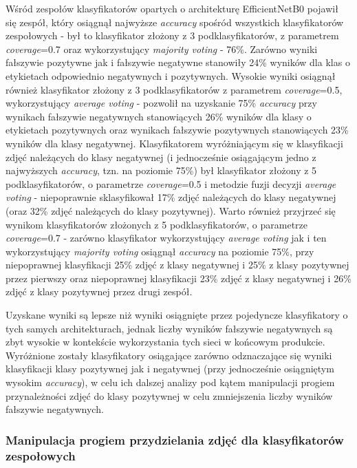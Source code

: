 \documentclass[polish,12pt]{aghthesis}
\begin{document}
Wśród zespołów klasyfikatorów opartych o architekturę EfficientNetB0 pojawił się zespół, który osiągnął najwyższe \textit{accuracy} spośród wszystkich klasyfikatorów zespołowych - był to klasyfikator złożony z 3 podklasyfikatorów, z parametrem \textit{coverage}=0.7 oraz wykorzystujący \textit{majority voting} - 76\%. Zarówno wyniki fałszywie pozytywne jak i fałszywie negatywne stanowiły 24\% wyników dla klas o etykietach odpowiednio negatywnych i pozytywnych. Wysokie wyniki osiągnął również klasyfikator złożony z 3 podklasyfikatorów z parametrem \textit{coverage}=0.5, wykorzystujący \textit{average voting} - pozwolił na uzyskanie 75\% \textit{accuracy} przy wynikach fałszywie negatywnych stanowiących 26\% wyników dla klasy o etykietach pozytywnych oraz wynikach fałszywie pozytywnych stanowiących 23\% wyników dla klasy negatywnej. Klasyfikatorem wyróżniającym się w klasyfikacji zdjęć należących do klasy negatywnej (i jednocześnie osiągającym jedno z najwyższych \textit{accuracy}, tzn. na poziomie 75\%) był klasyfikator złożony z 5 podklasyfikatorów, o parametrze \textit{coverage}=0.5 i metodzie fuzji decyzji \textit{average voting} - niepoprawnie sklasyfikował 17\% zdjęć należących do klasy negatywnej (oraz 32\% zdjęć należących do klasy pozytywnej). Warto również przyjrzeć się wynikom klasyfikatorów złożonych z 5 podklasyfikatorów, o parametrze \textit{coverage}=0.7 - zarówno klasyfikator wykorzystujący \textit{average voting} jak i ten wykorzystujący \textit{majority voting} osiągnął \textit{accuracy} na poziomie 75\%, przy niepoprawnej klasyfikacji 25\% zdjęć z klasy negatywnej i 25\% z klasy pozytywnej przez pierwszy oraz niepoprawnej klasyfikacji 23\% zdjęć z klasy negatywnej i 26\% zdjęć z klasy pozytywnej przez drugi zespół.
\par
Uzyskane wyniki są lepsze niż wyniki osiągnięte przez pojedyncze klasyfikatory o tych samych architekturach, jednak liczby wyników fałszywie negatywnych są zbyt wysokie w kontekście wykorzystania tych sieci w końcowym produkcie. Wyróżnione zostały klasyfikatory osiągające zarówno odznaczające się wyniki klasyfikacji klasy pozytywnej jak i negatywnej (przy jednocześnie osiągniętym wysokim \textit{accuracy}), w celu ich dalszej analizy pod kątem manipulacji progiem przynależności zdjęć do klasy pozytywnej w celu zmniejszenia liczby wyników fałszywie negatywnych.


\subsubsection{Manipulacja progiem przydzielania zdjęć dla klasyfikatorów zespołowych}
\end{document}
